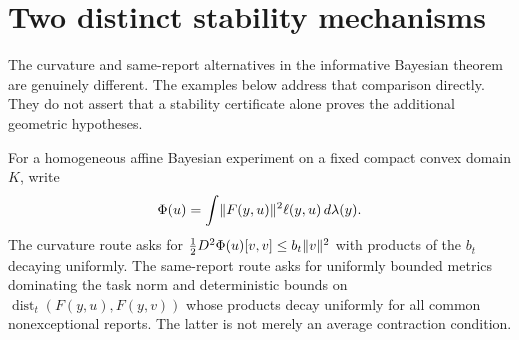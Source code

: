 \section{Two distinct stability mechanisms}\label{app:separation}
The curvature and same-report alternatives in the informative Bayesian theorem~\cite{GTF32} are genuinely different. The examples below address that comparison directly. They do not assert that a stability certificate alone proves the additional geometric hypotheses.

For a homogeneous affine Bayesian experiment on a fixed compact convex domain $K$, write
\[
 \Phi(u)=\int\lVert F(y,u)\rVert^2\ell(y,u)\,d\lambda(y).
\]
The curvature route asks for $\frac12D^2\Phi(u)[v,v]\le b_t\lVert v\rVert^2$ with products of the $b_t$ decaying uniformly. The same-report route asks for uniformly bounded metrics dominating the task norm and deterministic bounds on $\operatorname{dist}_t(F(y,u),F(y,v))$ whose products decay uniformly for all common nonexceptional reports. The latter is not merely an average contraction condition.

